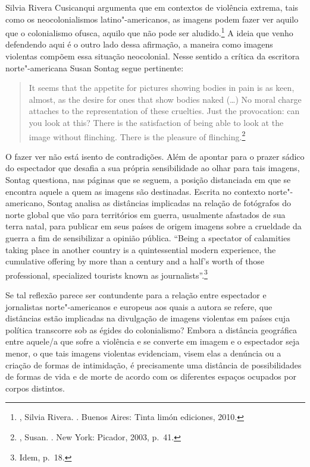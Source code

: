 \asterisc

Silvia Rivera Cusicanqui argumenta que em contextos de violência extrema,
tais como os neocolonialismos latino"-americanos, as imagens podem fazer
ver aquilo que o colonialismo ofusca, aquilo que não pode ser
aludido.\footnote{, Silvia Rivera. {}. Buenos Aires: Tinta limón
  ediciones, 2010.} A ideia que venho defendendo aqui é o outro lado
dessa afirmação, a maneira como imagens violentas compõem essa situação
neocolonial. Nesse sentido a crítica da escritora norte"-americana Susan
Sontag segue pertinente:

\begin{quote}
It seems that the appetite for pictures showing bodies in pain is as
keen, almost, as the desire for ones that show bodies naked (\ldots{}) No
moral charge attaches to the representation of these cruelties. Just the
provocation: can you look at this? There is the satisfaction of being
able to look at the image without flinching. There is the pleasure of
flinching.\footnote{, Susan. {}. New York: Picador, 2003, p.~41.}
\end{quote}

O fazer ver não está isento de contradições. Além de apontar para o
prazer sádico do espectador que desafia a sua própria sensibilidade ao
olhar para tais imagens, Sontag questiona, nas páginas que se seguem, a
posição distanciada em que se encontra aquele a quem as imagens são
destinadas. Escrita no contexto norte"-americano, Sontag analisa as
distâncias implicadas na relação de fotógrafos do norte global que vão
para territórios em guerra, usualmente afastados de sua terra natal,
para publicar em seus países de origem imagens sobre a crueldade da
guerra a fim de sensibilizar a opinião pública. ``Being a spectator of
calamities taking place in another country is a quintessential modern
experience, the cumulative offering by more than a century and a half's
worth of those professional, specialized tourists known as
journalists''.\footnote{Idem, p.~18.}

Se tal reflexão parece ser contundente para a relação entre espectador e
jornalistas norte"-americanos e europeus aos quais a autora se refere,
que distâncias estão implicadas na divulgação de imagens violentas em
países cuja política transcorre sob as égides do colonialismo? Embora a
distância geográfica entre aquele/a que sofre a violência e se converte
em imagem e o espectador seja menor, o que tais imagens violentas
evidenciam, visem elas a denúncia ou a criação de formas de intimidação,
é precisamente uma distância de possibilidades de formas de vida e de
morte de acordo com os diferentes espaços ocupados por corpos distintos.

